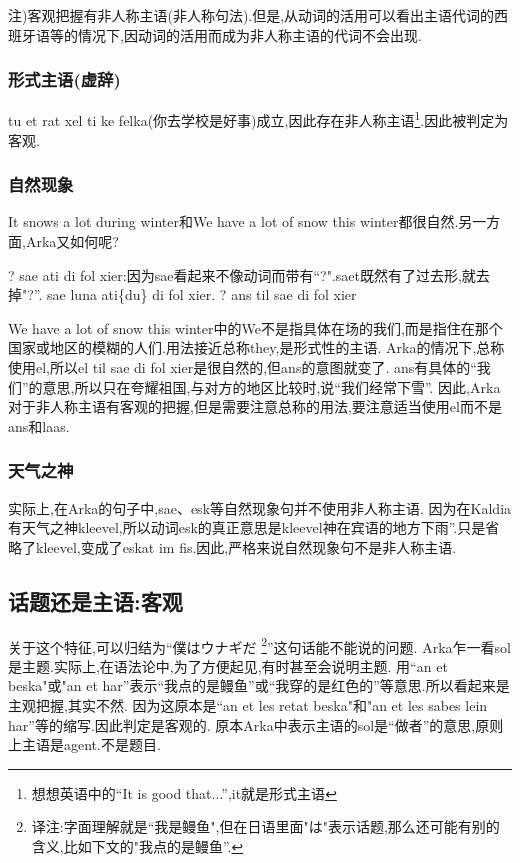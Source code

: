 注)客观把握有非人称主语(非人称句法).但是,从动词的活用可以看出主语代词的西班牙语等的情况下,因动词的活用而成为非人称主语的代词不会出现.

\subsubsection{形式主语(虚辞)}

tu et rat xel ti ke felka(你去学校是好事)成立,因此存在非人称主语\footnote{想想英语中的``It is good that...'',it就是形式主语}.因此被判定为客观.

\subsubsection{自然现象}

It snows a lot during winter和We have a lot of snow this winter都很自然.另一方面,Arka又如何呢?

? sae ati di fol xier:因为sae看起来不像动词而带有``?".saet既然有了过去形,就去掉"?''.
sae luna ati\{du\} di fol xier.
? ans til sae di fol xier

We have a lot of snow this winter中的We不是指具体在场的我们,而是指住在那个国家或地区的模糊的人们.用法接近总称they,是形式性的主语.
Arka的情况下,总称使用el,所以el til sae di fol xier是很自然的,但ans的意图就变了.
ans有具体的“我们”的意思,所以只在夸耀祖国,与对方的地区比较时,说“我们经常下雪”.
因此,Arka对于非人称主语有客观的把握,但是需要注意总称的用法,要注意适当使用el而不是ans和laas.

\subsubsection{天气之神}

实际上,在Arka的句子中,sae、esk等自然现象句并不使用非人称主语.
因为在Kaldia有天气之神kleevel,所以动词esk的真正意思是kleevel神在宾语的地方下雨”.只是省略了kleevel,变成了eskat im fis.因此,严格来说自然现象句不是非人称主语.

\subsection{话题还是主语:客观}

关于这个特征,可以归结为“僕はウナギだ
\footnote{译注:字面理解就是``我是鳗鱼",但在日语里面"は"表示话题,那么还可能有别的含义,比如下文的"我点的是鳗鱼''.}”这句话能不能说的问题.
Arka乍一看sol是主题.实际上,在语法论中,为了方便起见,有时甚至会说明主题.
用``an et beska"或"an et har''表示“我点的是鳗鱼”或“我穿的是红色的”等意思.所以看起来是主观把握,其实不然.
因为这原本是``an et les retat beska"和"an et les sabes lein har''等的缩写.因此判定是客观的.
原本Arka中表示主语的sol是“做者”的意思,原则上主语是agent.不是题目.

